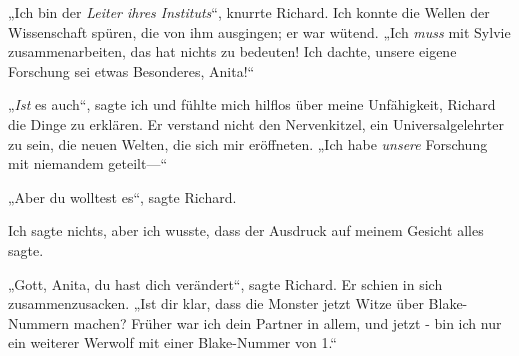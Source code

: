 „Ich bin der \emph{Leiter ihres Instituts}“, knurrte Richard. Ich konnte die Wellen der Wissenschaft spüren, die von ihm ausgingen; er war wütend. „Ich \emph{muss} mit Sylvie zusammenarbeiten, das hat nichts zu bedeuten! Ich dachte, unsere eigene Forschung sei etwas Besonderes, Anita!“

„\emph{Ist} es auch“, sagte ich und fühlte mich hilflos über meine Unfähigkeit, Richard die Dinge zu erklären. Er verstand nicht den Nervenkitzel, ein Universalgelehrter zu sein, die neuen Welten, die sich mir eröffneten. „Ich habe \emph{unsere} Forschung mit niemandem geteilt—“

„Aber du wolltest es“, sagte Richard.

Ich sagte nichts, aber ich wusste, dass der Ausdruck auf meinem Gesicht alles sagte.

„Gott, Anita, du hast dich verändert“, sagte Richard. Er schien in sich zusammenzusacken. „Ist dir klar, dass die Monster jetzt Witze über Blake-Nummern machen? Früher war ich dein Partner in allem, und jetzt - bin ich nur ein weiterer Werwolf mit einer Blake-Nummer von 1.“

